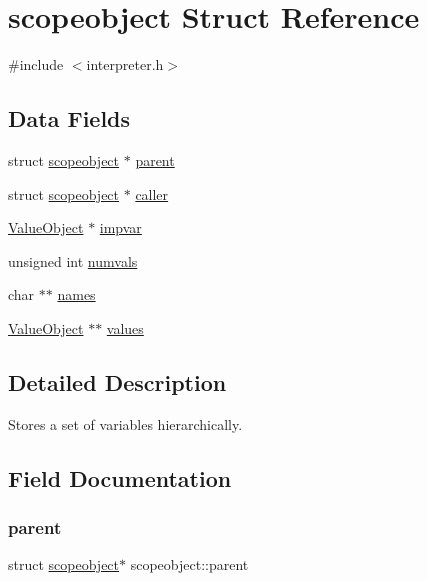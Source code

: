 \hypertarget{structscopeobject}{}\section{scopeobject Struct Reference}
\label{structscopeobject}


{\ttfamily \#include $<$interpreter.\+h$>$}

\subsection*{Data Fields}
\begin{DoxyCompactItemize}
\item 
struct \hyperlink{structscopeobject}{scopeobject} $\ast$ \hyperlink{structscopeobject_aa2e35271cf1ca0ecb0f8d256f6d3f78e}{parent}
\item 
struct \hyperlink{structscopeobject}{scopeobject} $\ast$ \hyperlink{structscopeobject_a279c4dacf326e1b913f69bcc5825896b}{caller}
\item 
\hyperlink{struct_value_object}{Value\+Object} $\ast$ \hyperlink{structscopeobject_ae41fb9156685d42f9b30c1871603c87b}{impvar}
\item 
unsigned int \hyperlink{structscopeobject_af8cb43430f28df6a4935d53ec1ac470b}{numvals}
\item 
char $\ast$$\ast$ \hyperlink{structscopeobject_a69981d4f863a3a236e052d8d7c911072}{names}
\item 
\hyperlink{struct_value_object}{Value\+Object} $\ast$$\ast$ \hyperlink{structscopeobject_a91d5a05990706ccd0dd32356fbb534ba}{values}
\end{DoxyCompactItemize}


\subsection{Detailed Description}
Stores a set of variables hierarchically. 

\subsection{Field Documentation}
\mbox{\label{structscopeobject_aa2e35271cf1ca0ecb0f8d256f6d3f78e}} 
\subsubsection{\texorpdfstring{parent}{parent}}
{\footnotesize\ttfamily struct \hyperlink{structscopeobject}{scopeobject}$\ast$ scopeobject\+::parent}

